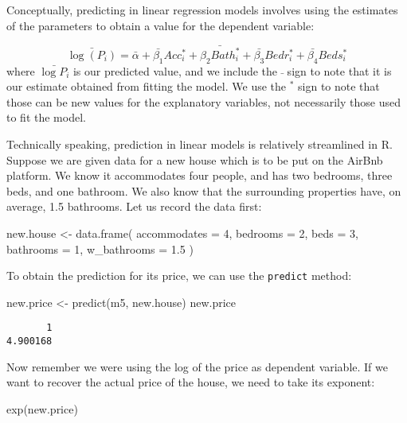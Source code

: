 \documentclass[
  letterpaper,
  krantz2]{style/krantz}
\newenvironment{Shaded}{\begin{snugshade}}{\end{snugshade}}
\newcommand{\AttributeTok}[1]{\textcolor[rgb]{0.40,0.45,0.13}{#1}}
\newcommand{\DecValTok}[1]{\textcolor[rgb]{0.68,0.00,0.00}{#1}}
\newcommand{\FloatTok}[1]{\textcolor[rgb]{0.68,0.00,0.00}{#1}}
\newcommand{\FunctionTok}[1]{\textcolor[rgb]{0.28,0.35,0.67}{#1}}
\newcommand{\NormalTok}[1]{\textcolor[rgb]{0.00,0.23,0.31}{#1}}
\newcommand{\OtherTok}[1]{\textcolor[rgb]{0.00,0.23,0.31}{#1}}
\begin{document}
Conceptually, predicting in linear regression models involves using the
estimates of the parameters to obtain a value for the dependent
variable:

\[
\bar{\log(P_i)} = \bar{\alpha} + \bar{\beta_1} Acc_i^* + \bar{\beta_2 Bath_i^*} + \bar{\beta_3} Bedr_i^* + \bar{\beta_4} Beds_i^*
\] where \(\bar{\log{P_i}}\) is our predicted value, and we include the
\(\bar{}\) sign to note that it is our estimate obtained from fitting
the model. We use the \(^*\) sign to note that those can be new values
for the explanatory variables, not necessarily those used to fit the
model.

Technically speaking, prediction in linear models is relatively
streamlined in R. Suppose we are given data for a new house which is to
be put on the AirBnb platform. We know it accommodates four people, and
has two bedrooms, three beds, and one bathroom. We also know that the
surrounding properties have, on average, 1.5 bathrooms. Let us record
the data first:

\begin{Shaded}
\begin{Highlighting}[]
\NormalTok{new.house }\OtherTok{\textless{}{-}} \FunctionTok{data.frame}\NormalTok{(}
  \AttributeTok{accommodates =} \DecValTok{4}\NormalTok{, }
  \AttributeTok{bedrooms =} \DecValTok{2}\NormalTok{,}
  \AttributeTok{beds =} \DecValTok{3}\NormalTok{,}
  \AttributeTok{bathrooms =} \DecValTok{1}\NormalTok{,}
  \AttributeTok{w\_bathrooms =} \FloatTok{1.5}
\NormalTok{)}
\end{Highlighting}
\end{Shaded}

To obtain the prediction for its price, we can use the \texttt{predict}
method:

\begin{Shaded}
\begin{Highlighting}[]
\NormalTok{new.price }\OtherTok{\textless{}{-}} \FunctionTok{predict}\NormalTok{(m5, new.house)}
\NormalTok{new.price}
\end{Highlighting}
\end{Shaded}

\begin{verbatim}
       1 
4.900168 
\end{verbatim}

Now remember we were using the log of the price as dependent variable.
If we want to recover the actual price of the house, we need to take its
exponent:

\begin{Shaded}
\begin{Highlighting}[]
\FunctionTok{exp}\NormalTok{(new.price)}
\end{Highlighting}
\end{Shaded}
\end{document}
